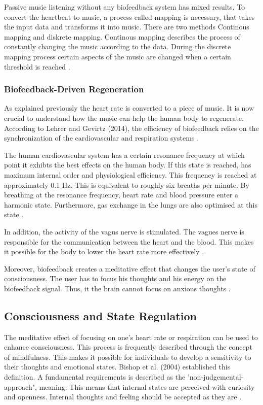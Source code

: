 Passive music listening without any biofeedback system has mixed results. To convert the heartbeat to music, a process called mapping is necessary, that takes the input data and transforms it into music. There are two methods Continous mapping and diskrete mapping. Continous mapping describes the process of constantly changing the music according to the data. During the discrete mapping process certain aspects of the music are changed when a certain threshold is reached \cite{bergstrom2014using}.

\subsubsection{Biofeedback-Driven Regeneration}

As explained previously the heart rate is converted to a piece of music. It is now crucial to understand how the music can help the human body to regenerate. According to Lehrer and Gevirtz (2014), the efficiency of biofeedback relies on the synchronization of the cardiovascular and respiration systems \cite{lehrer2014heart}.

The human cardiovascular system has a certain resonance frequency at which point it exhibts the best effects on the human body. If this state is reached, has maximum internal order and physiological efficiency. This frequency is reached at approximately 0.1 Hz. This is equivalent to roughly six breaths per minute. By breathing at the resonance frequency, heart rate and blood pressure enter a harmonic state. Furthermore, gas exchange in the lungs are also optimised at this state \cite{lehrer2014heart}.

In addition, the activity of the vagus nerve is stimulated. The vagues nerve is responsible for the communication between the heart and the blood. This makes it possible for the body to lower the heart rate more effectively \cite{lehrer2014heart}.

Moreover, biofeedback creates a meditative effect that changes the user's state of consciousness. The user has to focus his thoughts and his energy on the biofeedback signal. Thus, it the brain cannot focus on anxious thoughts \cite{lehrer2014heart}.

\subsection{Consciousness and State Regulation}

The meditative effect of focusing on one's heart rate or respiration can be used to enhance consciousness. This process is frequently described through the concept of mindfulness. This makes it possible for individuals to develop a sensitivity to their thoughts and emotional states. Bishop et al. (2004) established this definition. A fundamental requirements is described as the 'non-judgemental-approach", meaning. This means that internal states are perceived with curiosity and openness. Internal thoughts and feeling should be accepted as they are \cite{bishop2004mindfulness}.


